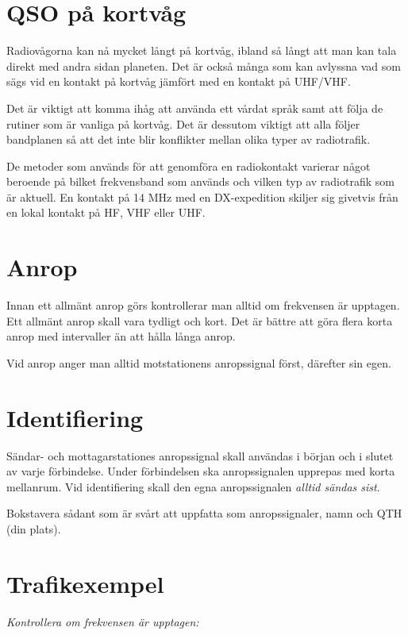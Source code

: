 \section{QSO på kortvåg}

Radiovågorna kan nå mycket långt på kortvåg, ibland så långt att man
kan tala direkt med andra sidan planeten. Det är också många som kan
avlyssna vad som sägs vid en kontakt på kortvåg jämfört med en kontakt
på UHF/VHF.

Det är viktigt att komma ihåg att använda ett vårdat språk samt att
följa de rutiner som är vanliga på kortvåg. Det är dessutom viktigt
att alla följer bandplanen så att det inte blir konflikter mellan
olika typer av radiotrafik.

De metoder som används för att genomföra en radiokontakt varierar
något beroende på bilket frekvensband som används och vilken typ av
radiotrafik som är aktuell. En kontakt på 14 MHz med en DX-expedition
skiljer sig givetvis från en lokal kontakt på HF, VHF eller UHF.

\section{Anrop}

Innan ett allmänt anrop görs kontrollerar man alltid om frekvensen är
upptagen. Ett allmänt anrop skall vara tydligt och kort. Det är bättre
att göra flera korta anrop med intervaller än att hålla långa anrop.

Vid anrop anger man alltid motstationens anropssignal först, därefter
sin egen.

\section{Identifiering}

Sändar- och mottagarstationes anropssignal skall användas i början och
i slutet av varje förbindelse. Under förbindelsen ska anropssignalen
upprepas med korta mellanrum. Vid identifiering skall den egna
anropssignalen \emph{alltid sändas sist}.

Bokstavera sådant som är svårt att uppfatta som anropssignaler, namn
och QTH (din plats).

\section{Trafikexempel}

\textit{Kontrollera om frekvensen är upptagen:}

